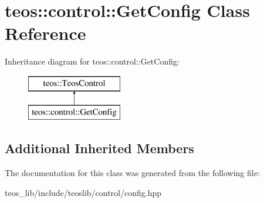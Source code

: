 \hypertarget{classteos_1_1control_1_1_get_config}{}\section{teos\+:\+:control\+:\+:Get\+Config Class Reference}
\label{classteos_1_1control_1_1_get_config}
Inheritance diagram for teos\+:\+:control\+:\+:Get\+Config\+:\begin{figure}[H]
\begin{center}
\leavevmode
\includegraphics[height=2.000000cm]{classteos_1_1control_1_1_get_config}
\end{center}
\end{figure}
\subsection*{Additional Inherited Members}


The documentation for this class was generated from the following file\+:\begin{DoxyCompactItemize}
\item 
teos\+\_\+lib/include/teoslib/control/config.\+hpp\end{DoxyCompactItemize}
